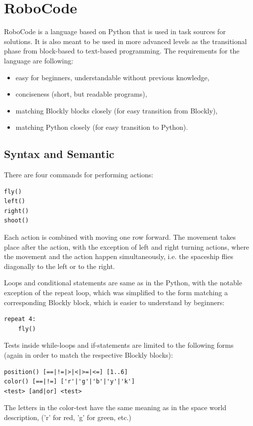 \section{RoboCode}

RoboCode is a language based on Python that is used in task sources for solutions.
It is also meant to be used in more advanced levels as the transitional phase
from block-based to text-based programming.
The requirements for the language are following:
\begin{itemize}
\item easy for beginners, understandable without previous knowledge,
\item conciseness (short, but readable programs),
\item matching Blockly blocks closely (for easy transition from Blockly),
\item matching Python closely (for easy transition to Python).
\end{itemize}

\subsection{Syntax and Semantic}
\label{sec:syntax-semantic}


There are four commands for performing actions:
\begin{lstlisting}
fly()
left()
right()
shoot()
\end{lstlisting}
Each action is combined with moving one row forward.
The movement takes place after the action, with the exception of left and right turning actions, where the movement and the action happen simultaneously,
i.e. the spaceship flies diagonally to the left or to the right.

Loops and conditional statements are same as in the Python,
with the notable exception of the repeat loop,
which was simplified to the form matching a corresponding
Blockly block, which is easier to understand by beginners:
\begin{lstlisting}
repeat 4:
    fly()
\end{lstlisting}

Tests inside while-loops and if-statements are limited to the following forms
(again in order to match the respective Blockly blocks):
\begin{lstlisting}
position() [==|!=|>|<|>=|<=] [1..6]
color() [==|!=] ['r'|'g'|'b'|'y'|'k']
<test> [and|or] <test>
\end{lstlisting}
The letters in the color-test have the same meaning as in the space world description,
('r' for red, 'g' for green, etc.)


